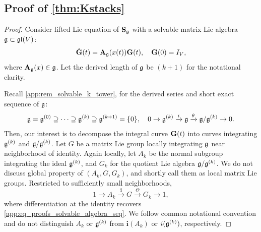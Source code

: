 \subsection{Proof of \cref{thm:Kstacks}}
\label{app:sub_proofKstacks}
\begin{proof}
    Consider lifted Lie equation of $\mathbf{S}_{\mathfrak{g}}$ with a solvable matrix Lie algebra $\mathfrak{g} \subset \mathfrak{gl}(V)$:
    \begin{equation}
    \label{app:eq_kstack_solvable_Lie_eq}
        \dot{\mathbf{G}}(t) = \mathbf{A}_{\mathfrak{g}}(x(t))\mathbf{G}(t),
        \quad
        \mathbf{G}(0) = I_V,
    \end{equation}
    where $\mathbf{A}_{\mathfrak{g}}(x) \in \mathfrak{g}$.
    Let the derived length of $\mathfrak{g}$ be $(k+1)$ for the notational clarity.

    Recall \cref{app:rem_solvable_k_tower}, for the derived series and short exact sequence of $\mathfrak{g}$:
    \begin{equation}
    \label{app:eq_proofs_solvable_algebra_seq}
        \mathfrak{g} = \mathfrak{g}^{(0)} \supseteq \cdots \supseteq \mathfrak{g}^{(k)} \supseteq \mathfrak{g}^{(k+1)} = \{0\},
        \quad
        0 \to \mathfrak{g}^{(k)} \xrightarrow{i} \mathfrak{g}  \xrightarrow{\theta} \mathfrak{g} / \mathfrak{g}^{(k)} \to 0.
    \end{equation}
    Then, our interest is to decompose the integral curve $\mathbf{G}(t)$ into curves integrating $\mathfrak{g}^{(k)}$ and $\mathfrak{g} / \mathfrak{g}^{(k)}$.
    Let $G$ be a matrix Lie group locally integrating $\mathfrak{g}$ near neighborhood of identity. Again locally, let $A_k$ be the normal subgroup integrating the ideal $\mathfrak{g}^{(k)}$, and $G_k$ for the quotient Lie algebra $\mathfrak{g} / \mathfrak{g}^{(k)}$.
    We do not discuss global property of $(A_k, G, G_k)$, and shortly call them as local matrix Lie groups. 
    Restricted to sufficiently small neighborhoods,
    \begin{equation*}
        1 \to A_k \xrightarrow{\boldsymbol i} G \xrightarrow{\Theta} G_k \to 1,
    \end{equation*}
    where differentiation at the identity recovers \cref{app:eq_proofs_solvable_algebra_seq}.
    We follow common notational convention and do not distinguish
    $A_k$ or $\mathfrak{g}^{(k)}$ from $\boldsymbol i(A_k)$ or $i(\mathfrak{g}^{(k)})$,
    respectively.
    

\end{proof}
